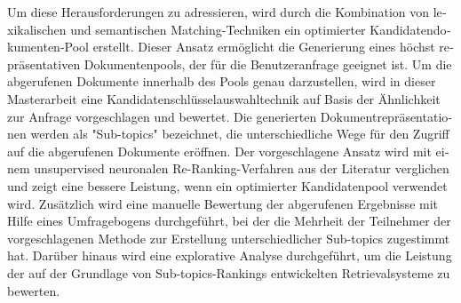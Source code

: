 \begin{otherlanguage}{ngerman}
Um diese Herausforderungen zu adressieren, wird durch die Kombination von lexikalischen und semantischen Matching-Techniken ein optimierter Kandidatendokumenten-Pool erstellt. Dieser Ansatz ermöglicht die Generierung eines höchst repräsentativen Dokumentenpools, der für die Benutzeranfrage geeignet ist. Um die abgerufenen Dokumente innerhalb des Pools genau darzustellen, wird in dieser Masterarbeit eine Kandidatenschlüsselauswahltechnik auf Basis der Ähnlichkeit zur Anfrage vorgeschlagen und bewertet. Die generierten Dokumentrepräsentationen werden als "Sub-topics" bezeichnet, die unterschiedliche Wege für den Zugriff auf die abgerufenen Dokumente eröffnen. Der vorgeschlagene Ansatz wird mit einem unsupervised neuronalen Re-Ranking-Verfahren aus der Literatur verglichen und zeigt eine bessere Leistung, wenn ein optimierter Kandidatenpool verwendet wird. Zusätzlich wird eine manuelle Bewertung der abgerufenen Ergebnisse mit Hilfe eines Umfragebogens durchgeführt, bei der die Mehrheit der Teilnehmer der vorgeschlagenen Methode zur Erstellung unterschiedlicher Sub-topics zugestimmt hat. Darüber hinaus wird eine explorative Analyse durchgeführt, um die Leistung der auf der Grundlage von Sub-topics-Rankings entwickelten Retrievalsysteme zu bewerten.\\
\\
\\
\\
\\
\\
\\
\\
\\
\\
\\
\\
\\
\\
\\
\\
\\
\\
\\


\end{otherlanguage}

